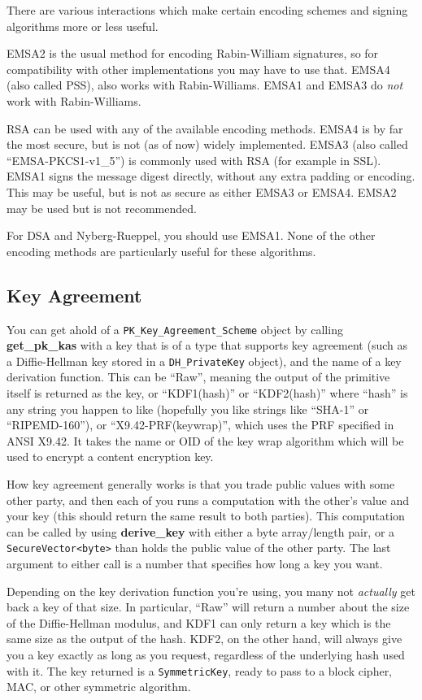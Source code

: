\documentclass{article}
\newcommand{\function}[1]{\textbf{#1}}
\newcommand{\type}[1]{\texttt{#1}}
\begin{document}
There are various interactions which make certain encoding schemes and signing
algorithms more or less useful.

EMSA2 is the usual method for encoding Rabin-William signatures, so for
compatibility with other implementations you may have to use that. EMSA4 (also
called PSS), also works with Rabin-Williams. EMSA1 and EMSA3 do \emph{not} work
with Rabin-Williams.

RSA can be used with any of the available encoding methods. EMSA4 is by far the
most secure, but is not (as of now) widely implemented. EMSA3 (also called
``EMSA-PKCS1-v1\_5'') is commonly used with RSA (for example in SSL). EMSA1
signs the message digest directly, without any extra padding or encoding. This
may be useful, but is not as secure as either EMSA3 or EMSA4. EMSA2 may be used
but is not recommended.

For DSA and Nyberg-Rueppel, you should use EMSA1. None of the other encoding
methods are particularly useful for these algorithms.

\subsection{Key Agreement}

You can get ahold of a \type{PK\_Key\_Agreement\_Scheme} object by calling
\function{get\_pk\_kas} with a key that is of a type that supports key
agreement (such as a Diffie-Hellman key stored in a \type{DH\_PrivateKey}
object), and the name of a key derivation function. This can be ``Raw'',
meaning the output of the primitive itself is returned as the key, or
``KDF1(hash)'' or ``KDF2(hash)'' where ``hash'' is any string you happen to
like (hopefully you like strings like ``SHA-1'' or ``RIPEMD-160''), or
``X9.42-PRF(keywrap)'', which uses the PRF specified in ANSI X9.42. It takes
the name or OID of the key wrap algorithm which will be used to encrypt a
content encryption key.

How key agreement generally works is that you trade public values with some
other party, and then each of you runs a computation with the other's value and
your key (this should return the same result to both parties). This computation
can be called by using \function{derive\_key} with either a byte array/length
pair, or a \type{SecureVector<byte>} than holds the public value of the other
party. The last argument to either call is a number that specifies how long a
key you want.

Depending on the key derivation function you're using, you many not
\emph{actually} get back a key of that size. In particular, ``Raw'' will return
a number about the size of the Diffie-Hellman modulus, and KDF1 can only return
a key which is the same size as the output of the hash. KDF2, on the other
hand, will always give you a key exactly as long as you request, regardless of
the underlying hash used with it. The key returned is a \type{SymmetricKey},
ready to pass to a block cipher, MAC, or other symmetric algorithm.
\end{document}
